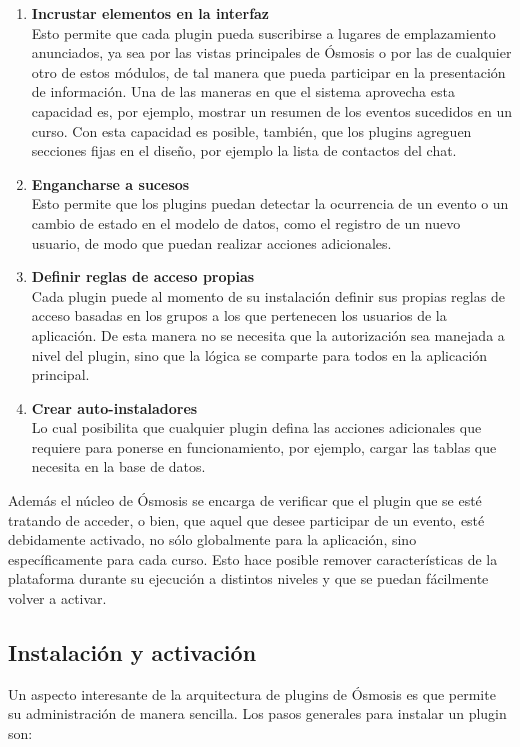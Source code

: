 \begin{enumerate}
	\item \textbf{Incrustar elementos en la interfaz} \\
	Esto permite que cada plugin pueda suscribirse a lugares de emplazamiento anunciados, ya sea por las vistas principales de Ósmosis o por las de cualquier otro de estos módulos, de tal manera que pueda participar en la presentación de información. Una de las maneras en que el sistema aprovecha esta capacidad es, por ejemplo, mostrar un resumen de los eventos sucedidos en un curso. Con esta capacidad es posible, también, que los plugins agreguen secciones fijas en el diseño, por ejemplo la lista de contactos del chat.
	\item \textbf{Engancharse a sucesos} \\
	Esto permite que los plugins puedan detectar la ocurrencia de un evento o un cambio de estado en el modelo de datos, como el registro de un nuevo usuario, de modo que puedan realizar acciones adicionales.
	\item \textbf{Definir reglas de acceso propias} \\
	Cada plugin puede al momento de su instalación definir sus propias reglas de acceso basadas en los grupos a los que pertenecen los usuarios de la aplicación. De esta manera no se necesita que la autorización sea manejada a nivel del plugin, sino que la lógica se comparte para todos en la aplicación principal.
	\item \textbf{Crear auto-instaladores} \\
	Lo cual posibilita que cualquier plugin defina las acciones adicionales que requiere para ponerse en funcionamiento, por ejemplo, cargar las tablas que necesita en la base de datos.
\end{enumerate}

Además el núcleo de Ósmosis se encarga de verificar que el plugin que se esté tratando de acceder, o bien, que aquel que desee participar de un evento, esté debidamente activado, no sólo globalmente para la aplicación, sino específicamente para cada curso. Esto hace posible remover características de la plataforma durante su ejecución a distintos niveles y que se puedan fácilmente volver a activar.

\subsection{Instalación y activación}
Un aspecto interesante de la arquitectura de plugins de Ósmosis es que permite su administración de manera sencilla. Los pasos generales para instalar un plugin son: 

